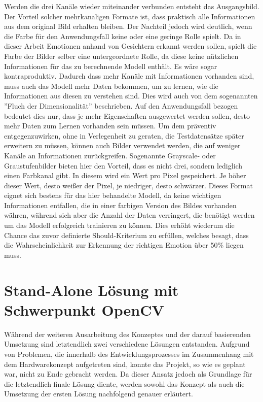 \documentclass[12pt, a4paper]{report}
\begin{document}
Werden die drei Kanäle wieder miteinander verbunden entsteht das Ausgangsbild. Der Vorteil solcher mehrkanaligen Formate ist, dass praktisch alle Informationen aus dem original Bild erhalten bleiben. Der Nachteil jedoch wird deutlich, wenn die Farbe für den Anwendungsfall keine oder eine geringe Rolle spielt. Da in dieser Arbeit Emotionen anhand von Gesichtern erkannt werden sollen, spielt die Farbe der Bilder selber eine untergeordnete Rolle, da diese keine nützlichen Informationen für das zu berechnende Modell enthält. Es wäre sogar kontraproduktiv. Dadurch dass mehr Kanäle mit Informationen vorhanden sind, muss auch das Modell mehr Daten bekommen, um zu lernen, wie die Informationen aus diesen zu verstehen sind. Dies wird auch von dem sogenannten ''Fluch der Dimensionalität'' beschrieben. Auf den Anwendungsfall bezogen bedeutet dies nur, dass je mehr Eigenschaften ausgewertet werden sollen, desto mehr Daten zum Lernen vorhanden sein müssen. Um dem präventiv entgegenzuwirken, ohne in Verlegenheit zu geraten, die Testdatensätze später erweitern zu müssen, können auch Bilder verwendet werden, die auf weniger Kanäle an Informationen zurückgreifen. Sogenannte Grayscale- oder Graustufenbilder bieten hier den Vorteil, dass es nicht drei, sondern lediglich einen Farbkanal gibt. In diesem wird ein Wert pro Pixel gespeichert. Je höher dieser Wert, desto weißer der Pixel, je niedriger, desto schwärzer. Dieses Format eignet sich bestens für das hier behandelte Modell, da keine wichtigen Informationen entfallen, die in einer farbigen Version des Bildes vorhanden währen, während sich aber die Anzahl der Daten verringert, die benötigt werden um das Modell erfolgreich trainieren zu können. Dies erhöht wiederum die Chance das zuvor definierte Should-Kriterium zu erfüllen, welches besagt, dass die Wahrscheinlichkeit zur Erkennung der richtigen Emotion über 50\% liegen muss. 

\let\cleardoublepage\relax

\chapter{Stand-Alone Lösung mit Schwerpunkt OpenCV}
Während der weiteren Ausarbeitung des Konzeptes und der darauf basierenden Umsetzung sind letztendlich zwei verschiedene Lösungen entstanden. Aufgrund von Problemen, die innerhalb des Entwicklungsprozesses im Zusammenhang mit dem Hardwarekonzept aufgetreten sind, konnte das Projekt, so wie es geplant war, nicht zu Ende gebracht werden. Da dieser Ansatz jedoch als Grundlage für die letztendlich finale Lösung diente, werden sowohl das Konzept als auch die Umsetzung der ersten Lösung nachfolgend genauer erläutert.
\end{document}
